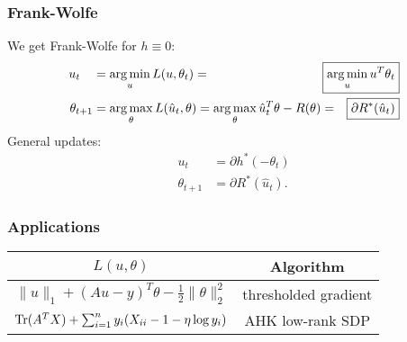 \documentclass{beamer}
\begin{document}
\begin{frame}
\frametitle{Frank-Wolfe}
\reminder
We get Frank-Wolfe for $h \equiv 0$:
\begin{align*}
u_t\,\,\,\,\,\, &= \argmin_u L(u, \theta_t) = \Aboxed{\argmin_u u^T\theta_t} \\
\theta_{t+1}    &= \argmax_{\theta} L(\hat{u}_t, \theta) = \argmax_{\theta} \hat{u}_t^T\theta - R(\theta) = \Aboxed{\partial R^*(\hat{u}_t)}
\end{align*}
\pause
General updates:
\begin{align*}
u_t\,\,\,\,\,\, &= \partial h^*(-\theta_t) \\
\theta_{t+1} &= \partial R^*(\hat{u}_t).
\end{align*}
\end{frame}

\begin{frame}
\frametitle{Applications}
\begin{tabular}{|c|c|}
\hline
$L(u,\theta)$ & Algorithm \\ \hline
$\|u\|_1 + (Au-y)^T\theta - \frac{1}{2}\|\theta\|_2^2$ & thresholded gradient \\ \hline
$\operatorname{Tr}(A^TX) + \sum_{i=1}^n y_i(X_{ii} -1 -\eta \log y_i)$ & AHK low-rank SDP \\ \hline
\end{tabular}
\end{frame}
\end{document}
